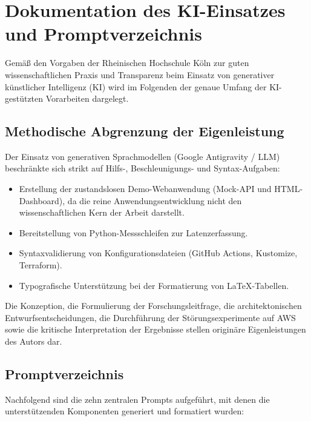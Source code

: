 \chapter{Dokumentation des KI-Einsatzes und Promptverzeichnis}
\label{app:ki-dokumentation}

Gemäß den Vorgaben der Rheinischen Hochschule Köln zur guten wissenschaftlichen Praxis und Transparenz beim Einsatz von generativer künstlicher Intelligenz (KI) wird im Folgenden der genaue Umfang der KI-gestützten Vorarbeiten dargelegt.

\section{Methodische Abgrenzung der Eigenleistung}
Der Einsatz von generativen Sprachmodellen (Google Antigravity / LLM) beschränkte sich strikt auf Hilfs-, Beschleunigungs- und Syntax-Aufgaben:
\begin{itemize}
    \item Erstellung der zustandslosen Demo-Webanwendung (Mock-API und HTML-Dashboard), da die reine Anwendungsentwicklung nicht den wissenschaftlichen Kern der Arbeit darstellt.
    \item Bereitstellung von Python-Messschleifen zur Latenzerfassung.
    \item Syntaxvalidierung von Konfigurationsdateien (GitHub Actions, Kustomize, Terraform).
    \item Typografische Unterstützung bei der Formatierung von LaTeX-Tabellen.
\end{itemize}

Die Konzeption, die Formulierung der Forschungsleitfrage, die architektonischen Entwurfsentscheidungen, die Durchführung der Störungsexperimente auf AWS sowie die kritische Interpretation der Ergebnisse stellen originäre Eigenleistungen des Autors dar.

\section{Promptverzeichnis}
Nachfolgend sind die zehn zentralen Prompts aufgeführt, mit denen die unterstützenden Komponenten generiert und formatiert wurden:

